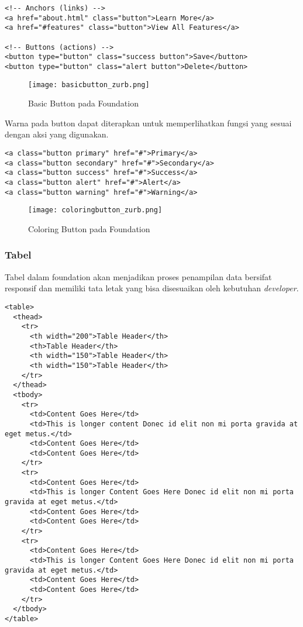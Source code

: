 \begin{lstlisting}[frame=single] 
<!-- Anchors (links) -->
<a href="about.html" class="button">Learn More</a>
<a href="#features" class="button">View All Features</a>

<!-- Buttons (actions) -->
<button type="button" class="success button">Save</button>
<button type="button" class="alert button">Delete</button>
\end{lstlisting}

\begin{figure} [H]
	\centering  
	\texttt{[image: basicbutton\_zurb.png]}  
	\caption{Basic Button pada Foundation}
\end{figure}

\noindent Warna pada button dapat diterapkan untuk memperlihatkan fungsi yang sesuai dengan aksi yang digunakan.
\begin{lstlisting}[frame=single] 
<a class="button primary" href="#">Primary</a>
<a class="button secondary" href="#">Secondary</a>
<a class="button success" href="#">Success</a>
<a class="button alert" href="#">Alert</a>
<a class="button warning" href="#">Warning</a>
\end{lstlisting}

\begin{figure} [H]
	\centering  
	\texttt{[image: coloringbutton\_zurb.png]}  
	\caption{Coloring Button pada Foundation}
\end{figure}

\subsubsection{Tabel}

Tabel dalam foundation akan menjadikan proses penampilan data bersifat responsif dan memiliki tata letak yang bisa disesuaikan oleh kebutuhan \textit{developer}.


\begin{lstlisting}[frame=single, basicstyle=\tiny] 
<table>
  <thead>
    <tr>
      <th width="200">Table Header</th>
      <th>Table Header</th>
      <th width="150">Table Header</th>
      <th width="150">Table Header</th>
    </tr>
  </thead>
  <tbody>
    <tr>
      <td>Content Goes Here</td>
      <td>This is longer content Donec id elit non mi porta gravida at eget metus.</td>
      <td>Content Goes Here</td>
      <td>Content Goes Here</td>
    </tr>
    <tr>
      <td>Content Goes Here</td>
      <td>This is longer Content Goes Here Donec id elit non mi porta gravida at eget metus.</td>
      <td>Content Goes Here</td>
      <td>Content Goes Here</td>
    </tr>
    <tr>
      <td>Content Goes Here</td>
      <td>This is longer Content Goes Here Donec id elit non mi porta gravida at eget metus.</td>
      <td>Content Goes Here</td>
      <td>Content Goes Here</td>
    </tr>
  </tbody>
</table>
\end{lstlisting}

